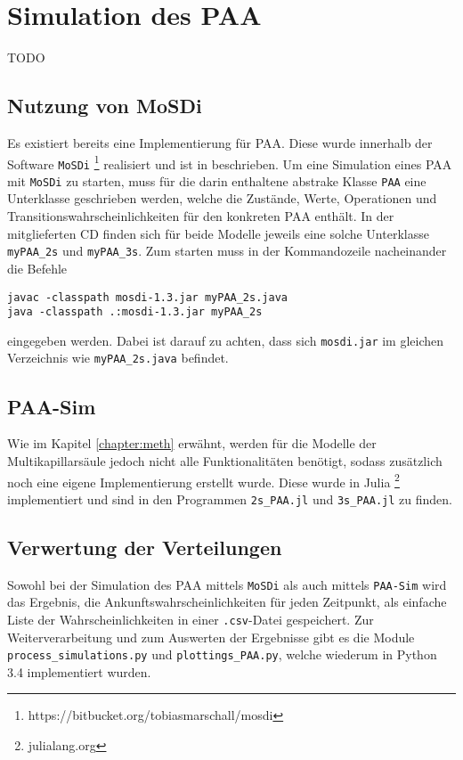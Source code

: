 
\section{Simulation des PAA}
TODO

\subsection{Nutzung von MoSDi}
Es existiert bereits eine Implementierung für PAA. Diese wurde innerhalb der Software \texttt{MoSDi} \footnote{https://bitbucket.org/tobiasmarschall/mosdi} realisiert und ist in \cite{Marschall2011} beschrieben. Um eine Simulation eines PAA mit \texttt{MoSDi} zu starten, muss für die darin enthaltene abstrake Klasse \texttt{PAA} eine Unterklasse geschrieben werden, welche die Zustände, Werte, Operationen und Transitionswahrscheinlichkeiten für den konkreten PAA enthält. In der mitglieferten CD finden sich für beide Modelle jeweils eine solche Unterklasse \texttt{myPAA\_2s} und \texttt{myPAA\_3s}. 
Zum starten muss in der Kommandozeile nacheinander die Befehle
\begin{verbatim}
javac -classpath mosdi-1.3.jar myPAA_2s.java
java -classpath .:mosdi-1.3.jar myPAA_2s 
\end{verbatim}
eingegeben werden. Dabei ist darauf zu achten, dass sich \texttt{mosdi.jar} im gleichen Verzeichnis wie \texttt{myPAA\_2s.java} befindet. 

\subsection{PAA-Sim}
Wie im Kapitel \ref{chapter:meth} erwähnt, werden für die Modelle der Multikapillarsäule jedoch nicht alle Funktionalitäten benötigt, sodass zusätzlich noch eine eigene Implementierung erstellt wurde. Diese wurde in Julia \footnote{julialang.org} implementiert und sind in den Programmen \verb!2s_PAA.jl! und \verb!3s_PAA.jl! zu finden.


\subsection{Verwertung der Verteilungen}
Sowohl bei der Simulation des PAA mittels \texttt{MoSDi} als auch mittels \texttt{PAA-Sim} wird das Ergebnis, die Ankunftswahrscheinlichkeiten für jeden Zeitpunkt, als einfache Liste der Wahrscheinlichkeiten in einer \texttt{.csv}-Datei gespeichert. Zur Weiterverarbeitung und zum Auswerten der Ergebnisse gibt es die Module \verb!process_simulations.py! und \verb!plottings_PAA.py!, welche wiederum in Python 3.4 implementiert wurden.

